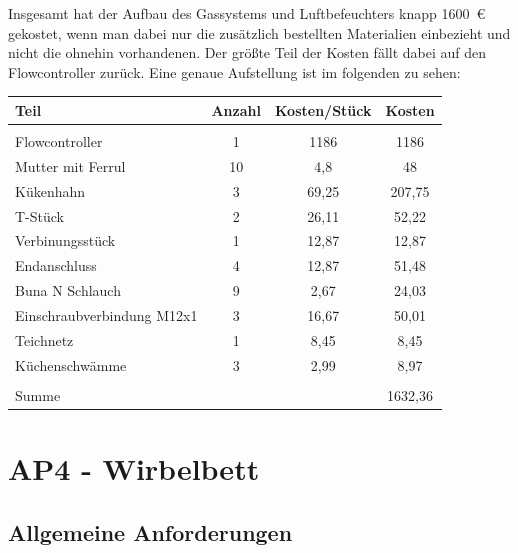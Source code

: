 Insgesamt hat der Aufbau des Gassystems und Luftbefeuchters knapp \SI{1600}{\euro} gekostet, wenn man dabei nur die zusätzlich bestellten Materialien einbezieht und nicht die ohnehin vorhandenen. Der größte Teil der Kosten fällt dabei auf den Flowcontroller zurück. Eine genaue Aufstellung ist im folgenden zu sehen:

\begin{center}
\begin{tabular}{l|c|c|c}
	Teil  & Anzahl & Kosten/Stück & Kosten \\
	\hline
	&       &       &  \\
	Flowcontroller & 1     & 1186  & 1186 \\
	Mutter mit Ferrul & 10    & 4,8   & 48 \\
	Kükenhahn & 3     & 69,25 & 207,75 \\
	T-Stück & 2     & 26,11 & 52,22 \\
	Verbinungsstück & 1     & 12,87 & 12,87 \\
	Endanschluss & 4     & 12,87 & 51,48 \\
	Buna N Schlauch & 9     & 2,67  & 24,03 \\
	Einschraubverbindung M12x1 & 3     & 16,67 & 50,01 \\
	Teichnetz & 1     & 8,45  & 8,45 \\
	Küchenschwämme & 3     & 2,99  & 8,97 \\
	\hline 
	&       &       &  \\
	Summe &       &       & 1632,36 \\
\end{tabular}
\end{center}

















\newpage

\section{AP4 - Wirbelbett}


\subsection{Allgemeine Anforderungen}

